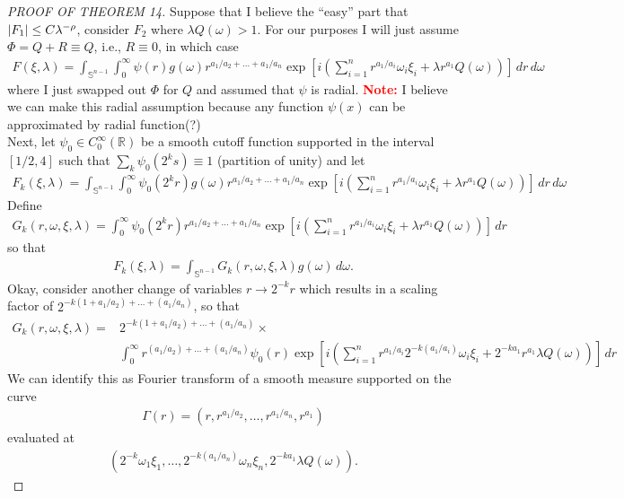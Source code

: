 \documentclass{article}
\theoremstyle{definition}
\newcommand{\lp}{\left(}
\newcommand{\rp}{\right)}
\newcommand{\lb}{\left[}
\newcommand{\rb}{\right]}
\begin{document}
\begin{proof}[PROOF OF THEOREM 14]
    Suppose that I believe the ``easy'' part that $\abs{F_1} \leq C\lambda^{-\rho}$, consider $F_2$ where $\lambda Q(\omega) > 1$. For our purposes I will just assume $\Phi = Q + R \equiv Q$, i.e., $R\equiv 0$, in which case
    \begin{align*}
        F(\xi,\lambda) = \int_{\mathbb{S}^{n-1}}\int^\infty_0 \psi(r)g(\omega)r^{a_1/a_2 +\dots+ a_1/a_n} \exp\lb i\lp \sum^n_{i=1}r^{a_1/a_i}\omega_i\xi_i  + \lambda r^{a_1}Q(\omega) \rp\rb \,dr\,d\omega
    \end{align*}
    where I just swapped out $\Phi$ for $Q$ and assumed that $\psi$ is radial. \textcolor{red}{\textbf{Note:}} I believe we can make this radial assumption because any function $\psi(x)$ can be approximated by radial function(?) \\
    
    Next, let $\psi_0 \in C^\infty_0(\mathbb{R})$ be a smooth cutoff function supported in the interval $[1/2,4]$ such that $\sum_k \psi_0(2^k s) \equiv 1$ (partition of unity) and let 
    \begin{align*}
        F_k(\xi,\lambda) = \int_{\mathbb{S}^{n-1}}\int^\infty_0 \psi_0(2^k r)g(\omega)r^{a_1/a_2 +\dots+ a_1/a_n} \exp\lb i\lp \sum^n_{i=1}r^{a_1/a_i}\omega_i\xi_i  + \lambda r^{a_1}Q(\omega) \rp\rb \,dr\,d\omega
    \end{align*}
    Define
    \begin{align*}
    G_k(r,\omega,\xi,\lambda) = \int^\infty_0 \psi_0(2^k r) r^{a_1/a_2 +\dots+ a_1/a_n} \exp\lb i\lp \sum^n_{i=1}r^{a_1/a_i}\omega_i\xi_i  + \lambda r^{a_1}Q(\omega) \rp\rb \,dr
    \end{align*}
    so that 
    \begin{align*}
        F_k(\xi,\lambda) = \int_{\mathbb{S}^{n-1}}G_k(r,\omega,\xi,\lambda) g(\omega)\,d\omega.
    \end{align*}
    Okay, consider another change of variables $r \to 2^{-k}r$ which results in a scaling factor of $2^{-k(1+a_1/a_2) + \dots + (a_1/a_n)}$, so that
    \begin{align*}
    G_k(r,\omega,\xi,\lambda) = &2^{-k(1+a_1/a_2) + \dots + (a_1/a_n)} \times \\&\int_0^\infty r^{(a_1/a_2)+\dots + (a_1/a_n)}\psi_0(r)\exp\lb i\lp \sum^n_{i=1}r^{a_1/a_i}2^{-k(a_1/a_{i})}\omega_i \xi_i  + 2^{-ka_1}r^{a_1}\lambda Q(\omega)\rp\rb \,dr
    \end{align*}
    We can identify this as Fourier transform of a smooth measure supported on the curve
    \begin{align*}
        \Gamma(r) = \lp r, r^{a_1/a_2}, \dots, r^{a_1/a_n},r^{a_1} \rp
    \end{align*}
    evaluated at
    \begin{align*}
        \lp 2^{-k}\omega_1\xi_1, \dots, 2^{-k(a_1/a_n)}\omega_n \xi_n, 2^{-ka_1}\lambda Q(\omega) \rp.
    \end{align*}
        
    
    
    
    
    
\end{proof}
\end{document}
